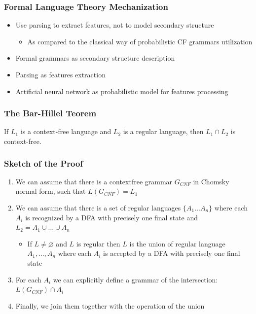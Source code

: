 \documentclass[xcolor=table]{beamer}
\begin{document}
\begin{frame} \frametitle{Formal Language Theory Mechanization}

\begin{itemize}
  \item Use parsing to extract features, not to model secondary structure
  \begin{itemize}
    \item As compared to the classical way of probabilistic CF grammars utilization
  \end{itemize}
  \pause
  \item Formal grammars as secondary structure description
  \item Parsing as features extraction
  \item Artificial neural network as probabilistic model for features processing
\end{itemize}

\end{frame}

\begin{frame} \frametitle{The Bar-Hillel Teorem}
\begin{theorem}
	If $L_1$ is a context-free language and $L_2$ is a regular language, then $L_1 \cap L_2$ is context-free.
\end{theorem}
\end{frame}

\begin{frame} \frametitle{Sketch of the Proof}
\begin{enumerate}
  \item We can assume that there is a contextfree grammar $G_{CNF}$ in Chomsky normal form, such that $L(G_{CNF}) = L_1$
  \pause
  \item We can assume that there is a set of regular languages $\{A_1 \ldots A_n\}$ where each $A_i$ is recognized by a DFA with precisely one final state and $L_2 = A_1 \cup \ldots \cup A_n$
  \pause
  \begin{itemize}
    \item If $ L \neq \varnothing $ and $L$ is regular then $L$ is the union of regular language $A_1, \ldots , A_n$ where each $A_i$ is accepted by a DFA with precisely one final state
  \end{itemize}
  \pause
  \item For each $A_i$ we can explicitly define a grammar of the intersection: $L(G_{CNF}) \cap A_i$
  \pause
  \item Finally, we join them together with the operation of the union
\end{enumerate}

\end{frame}
\end{document}

